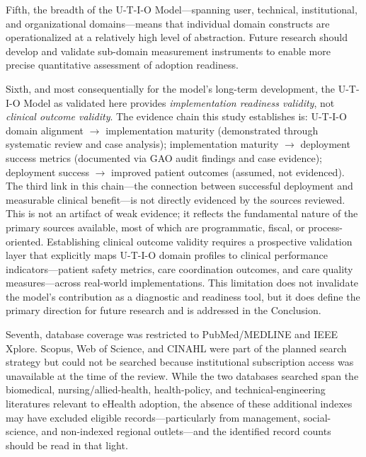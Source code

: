 Fifth, the breadth of the U-T-I-O Model—spanning user, technical, institutional, and organizational domains—means that individual domain constructs are operationalized at a relatively high level of abstraction. Future research should develop and validate sub-domain measurement instruments to enable more precise quantitative assessment of adoption readiness.

Sixth, and most consequentially for the model's long-term development, the U-T-I-O Model as validated here provides \textit{implementation readiness validity}, not \textit{clinical outcome validity}. The evidence chain this study establishes is: U-T-I-O domain alignment $\rightarrow$ implementation maturity (demonstrated through systematic review and case analysis); implementation maturity $\rightarrow$ deployment success metrics (documented via GAO audit findings and case evidence); deployment success $\rightarrow$ improved patient outcomes (assumed, not evidenced). The third link in this chain—the connection between successful deployment and measurable clinical benefit—is not directly evidenced by the sources reviewed. This is not an artifact of weak evidence; it reflects the fundamental nature of the primary sources available, most of which are programmatic, fiscal, or process-oriented. Establishing clinical outcome validity requires a prospective validation layer that explicitly maps U-T-I-O domain profiles to clinical performance indicators—patient safety metrics, care coordination outcomes, and care quality measures—across real-world implementations. This limitation does not invalidate the model's contribution as a diagnostic and readiness tool, but it does define the primary direction for future research and is addressed in the Conclusion.

Seventh, database coverage was restricted to PubMed/MEDLINE and IEEE Xplore. Scopus, Web of Science, and CINAHL were part of the planned search strategy but could not be searched because institutional subscription access was unavailable at the time of the review. While the two databases searched span the biomedical, nursing/allied-health, health-policy, and technical-engineering literatures relevant to eHealth adoption, the absence of these additional indexes may have excluded eligible records---particularly from management, social-science, and non-indexed regional outlets---and the identified record counts should be read in that light.

